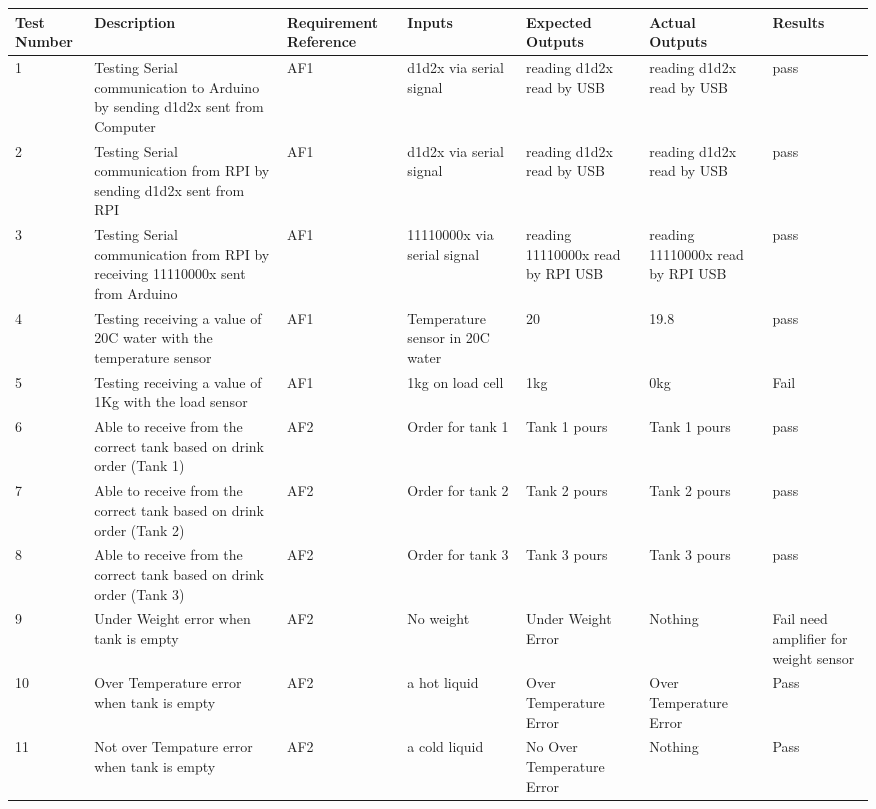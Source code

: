 \documentclass [10pt]{article}
\begin{document}
	\begin{longtable}{| p{} | p{} | p{} | p{} | p{} | p{} | p{} |}\hline 
		\rowcolor{tableCell}\textbf{Test Number} & \textbf{Description} & \textbf{Requirement Reference} & \textbf{Inputs} & \textbf{Expected Outputs} & \textbf{Actual Outputs}& \textbf{Results} \\ \hline
		1 &  Testing Serial communication to Arduino by sending d1d2x sent from Computer &  AF1 &  d1d2x via serial signal &  reading d1d2x read by USB & reading d1d2x read by USB &  pass
		\\ \hline  
		2 &  Testing Serial communication from RPI by sending d1d2x sent from RPI &  AF1 & d1d2x via serial signal &  reading d1d2x read by USB & reading d1d2x read by USB &  pass
		\\ \hline  
		3 &  Testing Serial communication from RPI by receiving 11110000x sent from Arduino & AF1& 11110000x via serial signal & reading 11110000x read by RPI USB & reading 11110000x read by RPI USB &  pass
		\\ \hline  
		4 &  Testing receiving a value of 20C water with the temperature sensor &  AF1 & Temperature sensor in 20C water &  20 &  19.8 &  pass
		\\ \hline  
		5 &  Testing receiving a value of 1Kg with the load sensor &  AF1 &  1kg on load cell  & 1kg &  0kg &  Fail \\ \hline  
		6 &  Able to receive from the correct tank based on drink order (Tank 1) &  AF2 &  Order for tank 1 &  Tank  1 pours &  Tank 1 pours &  pass
		\\ \hline  
		7 &  Able to receive from the correct tank based on drink order (Tank 2) &  AF2 &  Order for tank 2 &  Tank  2 pours &  Tank 2 pours &  pass
		\\ \hline  
		8 &  Able to receive from the correct tank based on drink order (Tank 3) &  AF2 &  Order for tank 3 &  Tank  3 pours &  Tank 3 pours &  pass
		\\ \hline  
		9 &  Under Weight error when tank is empty &  AF2 &  No weight &  Under Weight Error &  Nothing  &  Fail need amplifier for weight sensor
		\\ \hline  
		10 &  Over Temperature error when tank is empty &  AF2 &  a hot liquid &  Over Temperature Error &  Over Temperature Error &  Pass
		\\ \hline  
		11 &  Not over Tempature error when tank is empty &  AF2 &  a cold liquid &  No Over Temperature Error &  Nothing &  Pass \\ \hline  
	\end{longtable}
\end{document}
